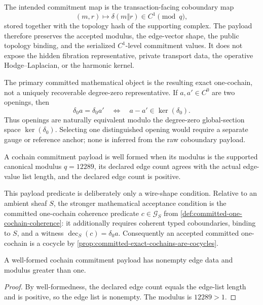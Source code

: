 The intended commitment map is the transaction-facing coboundary map
\[
  (m,r) \longmapsto \delta(m\Vert r) \in C^1 \pmod q,
\]
stored together with the topology hash of the supporting complex. The payload
therefore preserves the accepted modulus, the edge-vector shape, the public
topology binding, and the serialized \(C^1\)-level commitment values. It does
not expose the hidden fibration representative, private transport data, the
operative Hodge--Laplacian, or the harmonic kernel.

The primary committed mathematical object is the resulting exact
one-cochain, not a uniquely recoverable degree-zero representative. If
\(a,a'\in C^0\) are two openings, then
\[
  \delta_0a=\delta_0a'
  \quad\Longleftrightarrow\quad
  a-a'\in\ker(\delta_0).
\]
Thus openings are naturally equivalent modulo the degree-zero global-section
space \(\ker(\delta_0)\). Selecting one distinguished opening would require a
separate gauge or reference anchor; none is inferred from the raw coboundary
payload.

\begin{definition}\label{def:commitment-well-formedness}
  A cochain commitment payload is well formed when its modulus is the supported
  canonical modulus \(q=12289\), its declared edge count agrees with the actual
  edge-value list length, and the declared edge count is positive.
\end{definition}

This payload predicate is deliberately only a wire-shape condition. Relative
to an ambient sheaf \(S\), the stronger mathematical acceptance condition is
the committed one-cochain coherence predicate \(c\in\mathcal G_S\) from
\cref{def:committed-one-cochain-coherence}: it additionally requires coherent
typed coboundaries, binding to \(S\), and a witness
\(\operatorname{dec}_S(c)=\delta_0a\). Consequently an accepted committed
one-cochain is a cocycle by
\cref{prop:committed-exact-cochains-are-cocycles}.

\begin{proposition}\label{prop:well-formed-committed-payloads}
  A well-formed cochain commitment payload has nonempty edge data and modulus
  greater than one.
\end{proposition}

\begin{proof}
  By well-formedness, the declared edge count equals the edge-list length and
  is positive, so the edge list is nonempty. The modulus is \(12289>1\).
\end{proof}

